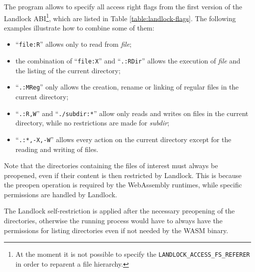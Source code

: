 The program allows to specify all access right flags from the first version of the Landlock
ABI\footnote{At the moment it is not possible to specify the \texttt{LANDLOCK\_ACCESS\_FS\_REFERER} in order to reparent a file hierarchy.},
which are listed in Table \ref{table:landlock-flags}.
The following examples illustrate how to combine some of them:
\begin{itemize}
  \item ``\texttt{file:R}'' allows only to read from \textit{file};
  \item the combination of ``\texttt{file:X}'' and ``\texttt{.:RDir}'' allows the execution of \textit{file} and the listing of the current directory;
  \item ``\texttt{.:MReg}'' only allows the creation, rename or linking of regular files in the current directory;
  \item ``\texttt{.:R,W}'' and ``\texttt{./subdir:*}'' allow only reads and writes on files in the current directory, while no restrictions are
        made for \textit{subdir};
  \item ``\texttt{.:*,-X,-W}'' allows every action on the current directory except for the reading and writing of files.
\end{itemize}

Note that the directories containing the files of interest must always be preopened,
even if their content is then restricted by Landlock. This is because the preopen operation
is required by the WebAssembly runtimes, while specific permissions are handled by Landlock.

The Landlock self-restriction is applied after the necessary preopening of the directories,
otherwise the running process would have to always have the permissions for listing directories even if
not needed by the WASM binary.

\vspace*{1cm}

